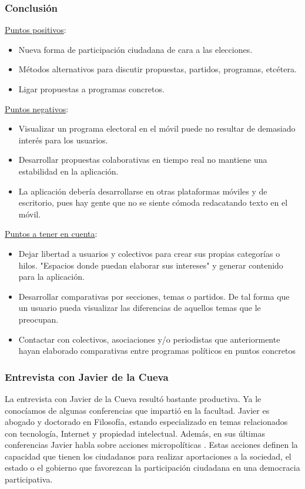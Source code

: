 \subsubsection{Conclusión}

\underline{Puntos positivos}:

\begin{itemize}
 \item Nueva forma de participación ciudadana de cara a las elecciones.
 \item Métodos alternativos para discutir propuestas, partidos, programas, etcétera.
 \item Ligar propuestas a programas concretos.
\end{itemize}

\underline{Puntos negativos}:

\begin{itemize}
 \item Visualizar un programa electoral en el móvil puede no resultar de demasiado interés para los usuarios.
 \item Desarrollar propuestas colaborativas en tiempo real no mantiene una estabilidad en la aplicación.
 \item La aplicación debería desarrollarse en otras plataformas móviles y de escritorio, pues hay gente que no se siente cómoda redacatando texto en el móvil.
\end{itemize}

\underline{Puntos a tener en cuenta}:

\begin{itemize}
 \item Dejar libertad a usuarios y colectivos para crear sus propias categorías o hilos. "Espacios donde puedan elaborar sus intereses" y generar contenido para la aplicación.
 \item Desarrollar comparativas por secciones, temas o partidos. De tal forma que un usuario pueda visualizar las diferencias de aquellos temas que le preocupan.
 \item Contactar con colectivos, asociaciones y/o periodistas que anteriormente hayan elaborado comparativas entre programas políticos en puntos concretos
\end{itemize}

\subsubsection{Entrevista con Javier de la Cueva}

La entrevista con Javier de la Cueva resultó bastante productiva. Ya le conocíamos de algunas conferencias que impartió en la facultad. Javier es abogado y doctorado en Filosofía, estando especializado en temas relacionados con tecnología, Internet y propiedad intelectual. Además, en sus últimas conferencias Javier habla sobre acciones micropolíticas \cite{ref:manualCiberactivista}. Estas acciones definen la capacidad que tienen los ciudadanos para realizar aportaciones a la sociedad, el estado o el gobierno que favorezcan la participación ciudadana en una democracia participativa.

